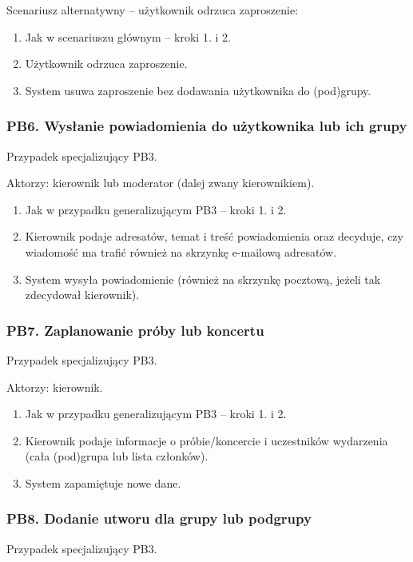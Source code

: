 \documentclass[11pt,a4paper]{article}
\renewcommand{\_}{\char`_}
\begin{document}
Scenariusz alternatywny – użytkownik odrzuca zaproszenie:
\begin{enumerate}
    \item Jak w scenariuszu głównym – kroki 1. i 2.
    \item Użytkownik odrzuca zaproszenie.
    \item System usuwa zaproszenie bez dodawania użytkownika do (pod)grupy.
\end{enumerate}

\subsubsection{PB6. Wysłanie powiadomienia do użytkownika lub ich grupy}

Przypadek specjalizujący PB3.

Aktorzy: kierownik lub moderator (dalej zwany kierownikiem).
\begin{enumerate}
    \item Jak w przypadku generalizującym PB3 – kroki 1. i 2.
    \item Kierownik podaje adresatów, temat i treść powiadomienia oraz decyduje, czy wiadomość ma trafić również na skrzynkę e-mailową adresatów.
    \item System wysyła powiadomienie (również na skrzynkę pocztową, jeżeli tak zdecydował kierownik).
\end{enumerate}

\subsubsection{PB7. Zaplanowanie próby lub koncertu}

Przypadek specjalizujący PB3.

Aktorzy: kierownik.
\begin{enumerate}
    \item Jak w przypadku generalizującym PB3 – kroki 1. i 2.
    \item Kierownik podaje informacje o próbie/koncercie i uczestników wydarzenia (cała (pod)grupa lub lista członków).
    \item System zapamiętuje nowe dane.
\end{enumerate}

\subsubsection{PB8. Dodanie utworu dla grupy lub podgrupy}

Przypadek specjalizujący PB3.
\end{document}
